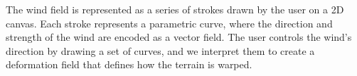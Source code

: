 The wind field is represented as a series of strokes drawn by the user on a 2D canvas. Each stroke represents a parametric curve, where the direction and strength of the wind are encoded as a vector field. The user controls the wind's direction by drawing a set of curves, and we interpret them to create a deformation field that defines how the terrain is warped.






